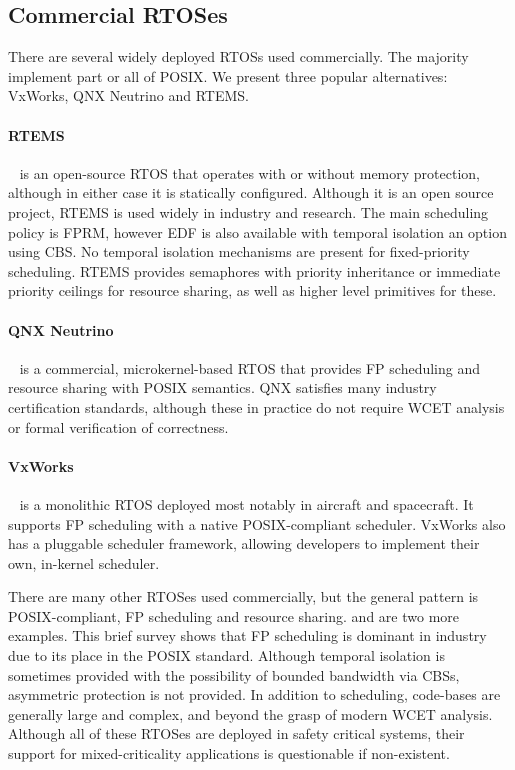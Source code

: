 \subsection{Commercial RTOSes}
There are several widely deployed \glspl{RTOS} used commercially. 
The majority implement part or all of \gls{POSIX}.
We present three popular alternatives: VxWorks, QNX Neutrino and RTEMS.

\paragraph{RTEMS}~\citep{RTEMS:URL} is an open-source \gls{RTOS} that operates with or without memory protection, although in either case it is statically configured.
Although it is an open source project, RTEMS is used widely in industry and research.
The main scheduling policy is \gls{FPRM}, however \gls{EDF} is also available with temporal isolation an option using \gls{CBS}.
No temporal isolation mechanisms are present for fixed-priority scheduling.
RTEMS provides semaphores with priority inheritance or immediate priority ceilings for resource sharing, as well as higher level primitives for these. 

\paragraph{QNX Neutrino}~\citep{QNX_10} is a commercial, microkernel-based \gls{RTOS} that provides \gls{FP} scheduling and resource sharing with POSIX semantics.
QNX satisfies many industry certification standards, although these in practice do not require {\gls{WCET}} analysis or formal verification of correctness.

\paragraph{VxWorks}~\citep{VxWorks_08} is a monolithic \gls{RTOS} deployed most notably in aircraft and spacecraft. 
It supports \gls{FP} scheduling with a native POSIX-compliant scheduler. 
VxWorks also has a pluggable scheduler framework, allowing developers to implement their own, in-kernel scheduler.

There are many other \gls{RTOS}es used commercially, but the general pattern is POSIX-compliant, \gls{FP} scheduling and resource sharing.
 \citet{Deos:URL} and \citet{PikeOS:URL} are two more examples.
This brief survey shows that \gls{FP} scheduling is dominant in industry due to its place in the POSIX standard. 
Although temporal isolation is sometimes provided with the possibility of bounded bandwidth via \glspl{CBS}, asymmetric protection is not provided.
In addition to scheduling, code-bases are generally large and complex, and beyond the grasp of modern {\gls{WCET}} analysis.
Although all of these \gls{RTOS}es are deployed in safety critical systems, their support for mixed-criticality applications is questionable if non-existent.


